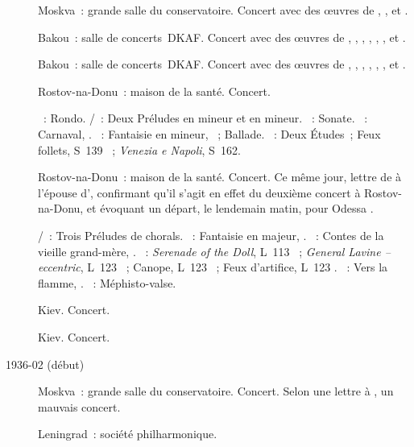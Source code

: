 \begin{description}
 \item[]
 Moskva~: grande salle du conservatoire.
 Concert avec des œuvres de \JBach{}, \Schumann{}, \Chopin{} et \Liszt{}.
 \item[]
 Bakou~: salle de concerts~DKAF.
 Concert avec des œuvres de \JBach{}, \Haydn{}, \Schumann{}, \Chopin{},
 \Liszt{}, \Debussy{}, \Prokofiev{} et \Scriabine{}.
 \item[]
 Bakou~: salle de concerts~DKAF.
 Concert avec des œuvres de \JBach{}, \Haydn{}, \Schumann{}, \Chopin{},
 \Liszt{}, \Debussy{}, \Prokofiev{} et \Scriabine{}.
 \item[]
 Rostov-na-Donu~: maison de la santé.
 Concert.

 \textsc{\JBach{}}~: Rondo.
 \textsc{\JBach{}/\Ziloti{}}~: Deux Préludes en \kE mineur et en \kB mineur.
 \textsc{\Haydn{}}~: Sonate.
 \textsc{\Schumann{}}~: Carnaval, .
 \textsc{\Chopin{}}~: Fantaisie en \kF mineur, ~; Ballade.
 \textsc{\Liszt{}}~: Deux Études~; Feux follets, S~139 ~;
 \emph{Venezia e Napoli}, S~162.
 \item[]
 Rostov-na-Donu~: maison de la santé.
 Concert.
 Ce même jour, lettre de \VSofronitsky{} à l'épouse d'\EVizel{}, confirmant
 qu'il s'agit en effet du deuxième concert à Rostov-na-Donu, et évoquant un
 départ, le lendemain matin, pour Odessa \citep[voir][p.~157]{Nekrasova08}.

 \textsc{\JBach{}/\Busoni{}}~: Trois Préludes de chorals.
 \textsc{\Schumann{}}~: Fantaisie en \kC majeur, .
 \textsc{\Prokofiev{}}~: Contes de la vieille grand-mère, .
 \textsc{\Debussy{}}~: \emph{Serenade of the Doll}, L~113 ~;
 \emph{General Lavine -- eccentric}, L~123 ~; Canope, L~123
 ~; Feux d'artifice, L~123 .
 \textsc{\Scriabine{}}~: Vers la flamme, .
 \textsc{\Liszt{}}~: Méphisto-valse.
 \item[]
 Kiev.
 Concert.
 \item[]
 Kiev.
 Concert.
 \item[1936-02 (début)]
 Moskva~: grande salle du conservatoire.
 Concert.
 Selon une lettre à \ESofronitskaya{}, un mauvais concert.
 \item[]
 Leningrad~: société philharmonique.


\end{description}
